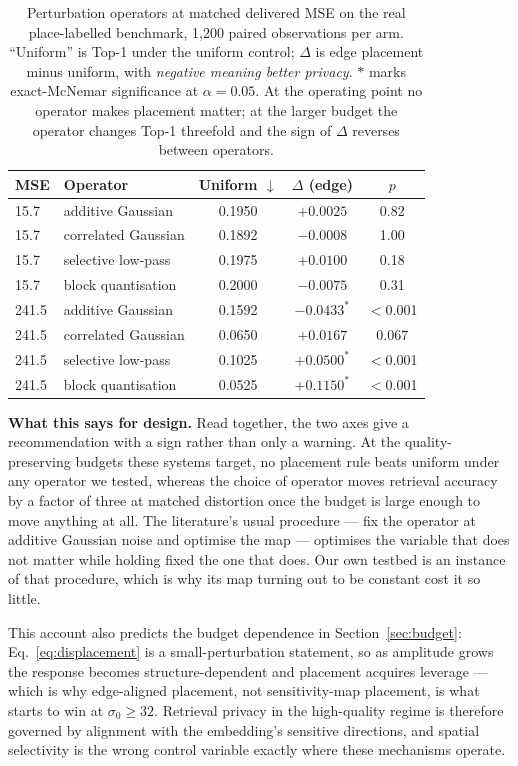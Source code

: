 \documentclass[10pt,journal]{IEEEtran}
\begin{document}
\begin{table}[t]
\centering
\caption{Perturbation operators at matched delivered MSE on the real
place-labelled benchmark, 1,200 paired observations per arm. ``Uniform'' is
Top-1 under the uniform control; $\Delta$ is edge placement minus uniform,
with \emph{negative meaning better privacy}. $\ast$ marks exact-McNemar
significance at $\alpha=0.05$. At the operating point no operator makes
placement matter; at the larger budget the operator changes Top-1 threefold
and the sign of $\Delta$ reverses between operators.}
\label{tab:operator}
\begin{tabular}{llccc}
\hline
MSE & Operator & Uniform $\downarrow$ & $\Delta$ (edge) & $p$ \\
\hline
15.7 & additive Gaussian    & 0.1950 & $+0.0025$ & 0.82 \\
15.7 & correlated Gaussian  & 0.1892 & $-0.0008$ & 1.00 \\
15.7 & selective low-pass   & 0.1975 & $+0.0100$ & 0.18 \\
15.7 & block quantisation   & 0.2000 & $-0.0075$ & 0.31 \\
\hline
241.5 & additive Gaussian   & 0.1592 & $-0.0433^{\ast}$ & $<$0.001 \\
241.5 & correlated Gaussian & 0.0650 & $+0.0167$ & 0.067 \\
241.5 & selective low-pass  & 0.1025 & $+0.0500^{\ast}$ & $<$0.001 \\
241.5 & block quantisation  & 0.0525 & $+0.1150^{\ast}$ & $<$0.001 \\
\hline
\end{tabular}
\end{table}

\textbf{What this says for design.} Read together, the two axes give a
recommendation with a sign rather than only a warning. At the quality-preserving
budgets these systems target, no placement rule beats uniform under any
operator we tested, whereas the choice of operator moves retrieval accuracy by
a factor of three at matched distortion once the budget is large enough to move
anything at all. The literature's usual procedure --- fix the operator at
additive Gaussian noise and optimise the map --- optimises the variable that
does not matter while holding fixed the one that does. Our own testbed is an
instance of that procedure, which is why its map turning out to be constant
cost it so little.

This account also predicts the budget dependence in
Section~\ref{sec:budget}: Eq.~\eqref{eq:displacement} is a small-perturbation
statement, so as amplitude grows the response becomes structure-dependent and
placement acquires leverage --- which is why edge-aligned placement, not
sensitivity-map placement, is what starts to win at $\sigma_0 \ge 32$. Retrieval privacy in
the high-quality regime is therefore governed by alignment with the
embedding's sensitive directions, and spatial selectivity is the wrong control
variable exactly where these mechanisms operate.
\end{document}
